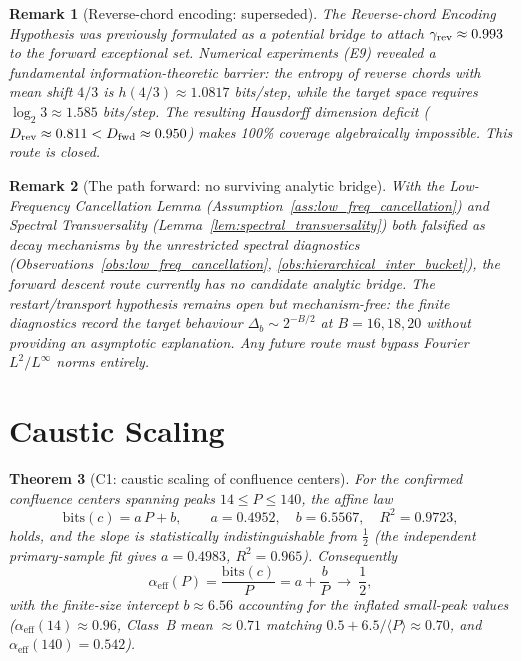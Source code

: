 \documentclass[12pt,a4paper]{article}
\newtheorem{theorem}{Theorem}[section]
\newtheorem{remark}[theorem]{Remark}
\begin{document}
\begin{remark}[Reverse-chord encoding: superseded]
\label{rem:reverse_encoding_superseded}
The Reverse-chord Encoding Hypothesis was previously formulated as a
potential bridge to attach $\gamma_{\rm rev} \approx 0.993$ to the forward
exceptional set. Numerical experiments (E9) revealed a fundamental
information-theoretic barrier: the entropy of reverse chords with mean
shift $4/3$ is $h(4/3) \approx 1.0817$ bits/step, while the target space
requires $\log_2 3 \approx 1.585$ bits/step. The resulting Hausdorff
dimension deficit ($D_{\rm rev} \approx 0.811 < D_{\rm fwd} \approx 0.950$)
makes 100\% coverage algebraically impossible. This route is closed.
\end{remark}

\begin{remark}[The path forward: no surviving analytic bridge]
With the Low-Frequency Cancellation Lemma (Assumption~\ref{ass:low_freq_cancellation})
and Spectral Transversality (Lemma~\ref{lem:spectral_transversality}) both
falsified as decay mechanisms by the unrestricted spectral diagnostics
(Observations~\ref{obs:low_freq_cancellation}, \ref{obs:hierarchical_inter_bucket}),
the forward descent route currently has \emph{no} candidate analytic bridge.
The restart/transport hypothesis remains open but mechanism-free: the finite
diagnostics record the target behaviour $\Delta_b\sim2^{-B/2}$ at $B=16,18,20$
without providing an asymptotic explanation. Any future route must bypass
Fourier $L^2/L^\infty$ norms entirely.
\end{remark}

\section{Caustic Scaling}

\begin{theorem}[C1: caustic scaling of confluence centers]
For the confirmed confluence centers spanning peaks $14 \le P \le 140$,
the affine law
\[
\mathrm{bits}(c) = a\,P + b,\qquad a = 0.4952,\quad b = 6.5567,\quad R^2 = 0.9723,
\]
holds, and the slope is statistically indistinguishable from $\tfrac12$
(the independent primary-sample fit gives $a=0.4983$, $R^2=0.965$).
Consequently
\[
\alpha_{\mathrm{eff}}(P)=\frac{\mathrm{bits}(c)}{P}=a+\frac{b}{P}\ \longrightarrow\ \frac12,
\]
with the finite-size intercept $b\approx6.56$ accounting for the inflated
small-peak values ($\alpha_{\mathrm{eff}}(14)\approx0.96$, Class~B mean
$\approx0.71$ matching $0.5+6.5/\langle P\rangle\approx0.70$, and
$\alpha_{\mathrm{eff}}(140)=0.542$).
\end{theorem}
\end{document}
